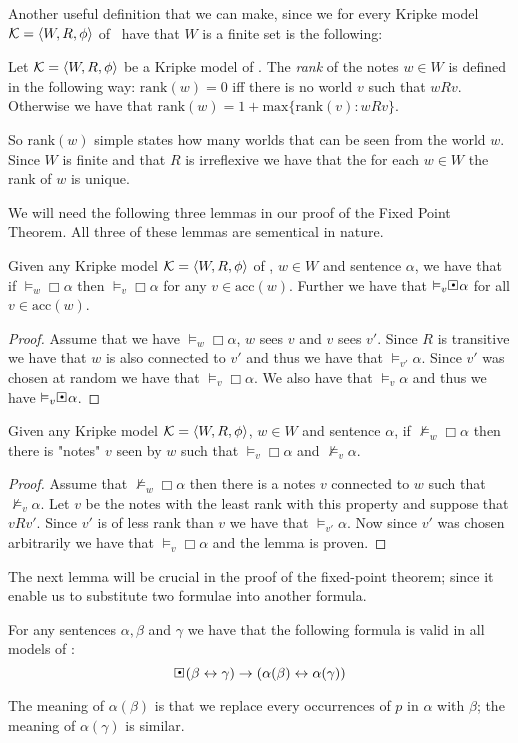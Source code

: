 \documentclass[../main.tex]{subfiles}
\begin{document}
Another useful definition that we can make, since we for every Kripke model
$\mathcal{K}=\langle W,R,\phi\rangle$ of \GL\  have that $W$ is a finite set is the following:
\begin{defi}
	Let $\mathcal{K}=\langle W,R,\phi\rangle$ be a Kripke model of \GL. The
	\textit{rank} of the notes $w\in W$ is defined in the following
	way: $\text{rank}(w)=0$ iff there is no world $v$ such that
	$wRv$. Otherwise we have that
	$\text{rank}(w)=1+\text{max}\{\text{rank}(v):wRv\}$.
\end{defi}
So rank$(w)$ simple states how many worlds that can be seen from the world $w$.
Since $W$ is finite and that $R$ is irreflexive we have that the for each $w\in
W$ the rank of $w$ is unique.

We will need the following three lemmas in our proof of the Fixed Point
Theorem.
All three of these lemmas are sementical in nature. 
\begin{lem}
	\label{lem:acc}
	Given any Kripke model $\mathcal{K}=\langle W,R,\phi\rangle$ of \GL, $w\in W$ and
	sentence $\alpha$, we have that if $\vDash_w\Box\alpha$ then
	$\vDash_v\Box\alpha$ for any $v\in\text{acc}(w)$. Further we have that
	$\vDash_v\sBox\alpha$ for all $v\in\text{acc}(w)$.
\end{lem}
\begin{proof}
	Assume that we have $\vDash_w\Box\alpha$, $w$ sees  $v$ and
	$v$ sees $v'$. Since $R$ is transitive we have that $w$ is also
	connected to $v'$ and thus we have that $\vDash_{v'}\alpha$. Since
	$v'$ was chosen at random we have that $\vDash_v\Box\alpha$. We also
	have that $\vDash_v\alpha$ and thus we have $\vDash_v\sBox\alpha$.
\end{proof}
\begin{lem}
	\label{lem:con}
	Given any Kripke model $\mathcal{K}=\langle W,R,\phi\rangle$, $w\in W$ and
	sentence $\alpha$, if $\not\vDash_w\Box\alpha$ then there is "notes"
	$v$ seen by  $w$ such that $\vDash_v\Box\alpha$ and
	$\not\vDash_v\alpha$.
\end{lem}
\begin{proof}
	Assume that $\not\vDash_w\Box\alpha$ then there is a notes $v$
	connected to $w$ such that $\not\vDash_v\alpha$. Let $v$ be the notes
	with the least rank with this property and suppose that $vRv'$. Since
	$v'$ is of less rank than $v$ we have that $\vDash_{v'}\alpha$. Now
	since $v'$ was chosen arbitrarily we have that $\vDash_v\Box\alpha$ and
	the lemma is proven.
\end{proof}
The next lemma will be crucial in the proof of the fixed-point theorem; since
it enable us to substitute two formulae into another formula.
\begin{lem}
	\label{lem:sem}
	For any sentences $\alpha,\beta$ and $\gamma$ we have that the
	following formula is valid in all models of \GL:
	$$\sBox(\beta\leftrightarrow\gamma)\rightarrow(\alpha(\beta)\leftrightarrow\alpha(\gamma))$$
\end{lem}
The meaning of $\alpha(\beta)$ is that we replace every occurrences of $p$ in
$\alpha$ with $\beta$; the meaning of $\alpha(\gamma)$ is similar.
\end{document}
